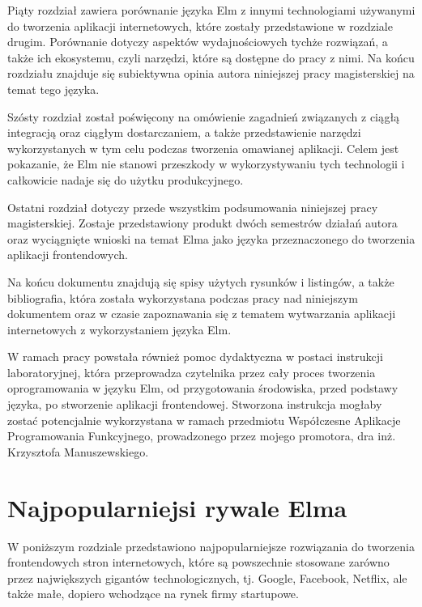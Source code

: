 \documentclass[twoside,a4paper]{report}
\begin{document}
Piąty rozdział zawiera porównanie języka Elm z innymi technologiami używanymi do tworzenia aplikacji internetowych, które zostały przedstawione w rozdziale drugim.
Porównanie dotyczy aspektów wydajnościowych tychże rozwiązań, a także ich ekosystemu, czyli narzędzi, które są dostępne do pracy z nimi.
Na końcu rozdziału znajduje się subiektywna opinia autora niniejszej pracy magisterskiej na temat tego języka.

Szósty rozdział został poświęcony na omówienie zagadnień związanych z ciągłą integracją oraz ciągłym dostarczaniem, a także przedstawienie narzędzi wykorzystanych w tym celu podczas tworzenia omawianej aplikacji.
Celem jest pokazanie, że Elm nie stanowi przeszkody w wykorzystywaniu tych technologii i całkowicie nadaje się do użytku produkcyjnego.

Ostatni rozdział dotyczy przede wszystkim podsumowania niniejszej pracy magisterskiej.
Zostaje przedstawiony produkt dwóch semestrów działań autora oraz wyciągnięte wnioski na temat Elma jako języka przeznaczonego do tworzenia aplikacji frontendowych.

Na końcu dokumentu znajdują się spisy użytych rysunków i listingów, a także bibliografia, która została wykorzystana podczas pracy nad niniejszym dokumentem oraz w czasie zapoznawania się z tematem wytwarzania aplikacji internetowych z wykorzystaniem języka Elm.

W ramach pracy powstała również pomoc dydaktyczna w postaci instrukcji laboratoryjnej, która przeprowadza czytelnika przez cały proces tworzenia oprogramowania w języku Elm, od przygotowania środowiska, przed podstawy języka, po stworzenie aplikacji frontendowej.
Stworzona instrukcja mogłaby zostać potencjalnie wykorzystana w ramach przedmiotu Współczesne Aplikacje Programowania Funkcyjnego, prowadzonego przez mojego promotora, dra inż. Krzysztofa Manuszewskiego.


\chapter{Najpopularniejsi rywale Elma}
W poniższym rozdziale przedstawiono najpopularniejsze rozwiązania do tworzenia frontendowych stron internetowych, które są powszechnie stosowane zarówno przez największych gigantów technologicznych, tj. Google, Facebook, Netflix, ale także małe, dopiero wchodzące na rynek firmy startupowe.
\end{document}
